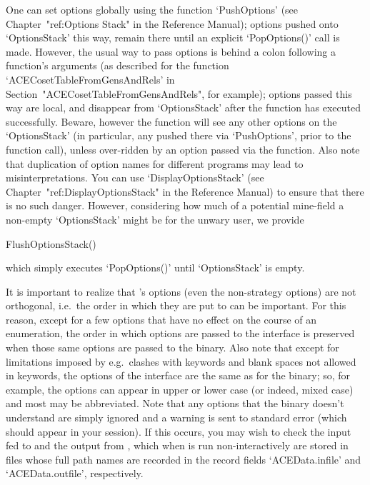 One can set options globally using  the  function  `PushOptions'  (see
Chapter~"ref:Options Stack" in the {\GAP} Reference  Manual);  options
pushed onto `OptionsStack' this way, remain there  until  an  explicit
`PopOptions()' call is made. However, the usual way to pass options is
behind a colon following a function's arguments (as described for  the
function               `ACECosetTableFromGensAndRels'               in
Section~"ACECosetTableFromGensAndRels", for example);  options  passed
this way are  local,  and  disappear  from  `OptionsStack'  after  the
function has executed successfully. Beware, however the function  will
see any other options on the `OptionsStack' (in particular, any pushed
there  via  `PushOptions',  prior  to  the  function   call),   unless
over-ridden by an option passed  via  the  function.  Also  note  that
duplication of  option  names  for  different  programs  may  lead  to
misinterpretations.   You   can   use    `DisplayOptionsStack'    (see
Chapter~"ref:DisplayOptionsStack" in the {\GAP} Reference  Manual)  to
ensure that there is no such danger. However, considering how much  of
a potential mine-field a non-empty `OptionsStack'  might  be  for  the
unwary user, we provide

\>FlushOptionsStack()

which simply executes `PopOptions()' until `OptionsStack' is empty.

It  is  important  to  realize  that  {\ACE}'s   options   (even   the
non-strategy options) are not orthogonal, i.e.\  the  order  in  which
they are put to {\ACE} can be important. For this reason, except for a
few options that have no effect on the course of an  enumeration,  the
order in which options are passed to the {\ACE} interface is preserved
when those same options are passed to the  {\ACE}  binary.  Also  note
that except for limitations  imposed  by  {\GAP}  e.g.\  clashes  with
{\GAP} keywords and blank spaces not allowed in keywords, the  options
of the {\ACE} interface are the  same  as  for  the  binary;  so,  for
example, the options can appear in upper or  lower  case  (or  indeed,
mixed case) and most may be abbreviated. Note that  any  options  that
the {\ACE} binary doesn't understand are simply ignored and a  warning
is sent  to  standard  error  (which  should  appear  in  your  {\GAP}
session). If this occurs, you may wish  to  check  the  input  fed  to
{\ACE}  and  the  output  from  {\ACE},  which  when  {\ACE}  is   run
non-interactively are stored  in  files  whose  full  path  names  are
recorded in the record fields `ACEData.infile' and  `ACEData.outfile',
respectively.

